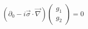 \begin{equation}
(\partial_{0} - i \vec{\sigma}\cdot \vec{\nabla}) 
\left(
\begin{array}{c}
g_{1}\\
g_{2}  
\end{array}  
\right)=0                 \label{127}
\end{equation}


